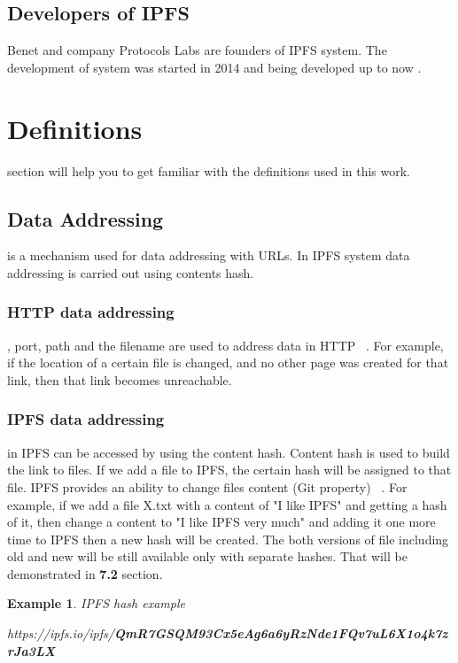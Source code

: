 \documentclass[a4paper,12pt,fleqn]{article}
\newtheorem{exmp}{Example}[subsection]
\begin{document}
\subsection{Developers of IPFS}
 Benet and company Protocols Labs are founders of IPFS system. The development of system was started in 2014 and being developed up to now \cite{JuanBenetInfo}.

\section{Definitions}
 section will help you to get familiar with the definitions used in this work.


\subsection{Data Addressing}
 is a mechanism used for data addressing with URLs. In IPFS system data addressing is carried out using contents hash. 

\subsubsection{HTTP data addressing}
, port, path and the filename are used to address data in HTTP ~\cite{HTTP}. For example, if the location of a certain file is changed, and no other page was created for that link, then that link becomes unreachable.

\subsubsection{IPFS data addressing}
 in IPFS can be accessed by using the content hash. Content hash is used to build the link to files. If we add a file to IPFS, the certain hash will be assigned to that file. IPFS provides an ability to change files content (Git property) ~\cite{benet2014ipfs}. For example, if we add a file X.txt with a content of "I like IPFS" and getting a hash of it, then change a content to "I like IPFS very much" and adding it one more time to IPFS then a new hash will be created. The both versions of file including old and new will be still available only with separate hashes. That will be demonstrated in \textbf{7.2} section.

\begin{exmp} IPFS hash example
\begin{center}
	https://ipfs.io/ipfs/\textbf{QmR7GSQM93Cx5eAg6a6yRzNde1FQv7uL6X1o4k7zrJa3LX}
\end{center}
\end{exmp}
\end{document}
